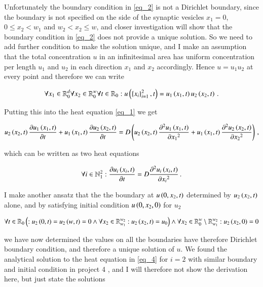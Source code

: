 \documentclass[11pt,english,a4paper]{article}
\begin{document}
\begin{flushleft}
Unfortunately the boundary condition in \eqref{eq_2} is not a Dirichlet boundary, since the boundary is not specified on the side of the synaptic vesicles $x_1=0$, $0\leq x_2 < w_1$ and $w_2 < x_2 \leq w$, and closer investigation will show that the boundary condition in \eqref{eq_2} does not provide a unique solution. So we need to add further condition to make the solution unique, and I make an assumption that the total concentration $u$ in an infinitesimal area has uniform concentration per length $u_1$ and $u_2$ in each direction $x_1$ and $x_2$ accordingly. Hence $u=u_1 u_2$ at every point and therefore we can write

\begin{align}
\forall x_1 \in \mathbb{R}_0^d \forall x_2 \in \mathbb{R}_0^w \forall t \in \mathbb{R}_{0}: u\left({\left\lbrace{x_i}\right\rbrace_{i=1}^2,t}\right) = u_1\left({x_1,t}\right) u_2\left({x_2,t}\right) \,.
\label{eq_3}
\end{align}

Putting this into the heat equation \eqref{eq_1} we get

\begin{align*}
u_2\left({x_2,t}\right)\frac{\partial u_1\left({x_1,t}\right)}{\partial t} + u_1\left({x_1,t}\right)\frac{\partial u_2\left({x_2,t}\right)}{\partial t} = D\left({u_2\left({x_2,t}\right)\frac{\partial^2 u_1\left({x_1,t}\right)}{\partial {x_1}^2} + u_1\left({x_1,t}\right)\frac{\partial^2 u_2\left({x_2,t}\right)}{\partial {x_2}^2}}\right) \,,
\end{align*}

which can be written as two heat equations

\begin{align}
\forall i \in \mathbb{N}_1^2 : \frac{\partial u_i\left({x_i,t}\right)}{\partial t}  = D \frac{\partial^2 u_i\left({x_i,t}\right)}{\partial {x_i}^2} \,.
\label{eq_4}
\end{align}

I make another ansatz that the the boundary at $u\left({0,x_2,t}\right)$ determined by $u_2\left({x_2,t}\right)$ alone, and by satisfying initial condition $u\left({0,x_2,0}\right)$ for $u_2$

\begin{align}
\forall t \in \mathbb{R}_0 \left({: u_2\left({0,t}\right) = u_2\left({w,t}\right) = 0 \wedge \forall x_2\in\mathbb{R}_{w_1}^{w_2}: u_2\left({x_2,t}\right) = u_0}\right) \wedge \forall x_2 \in\mathbb{R}_{0}^{w} \setminus \mathbb{R}_{w_1}^{w_2}: u_2\left({x_2,0}\right) = 0
\label{eq_5}
\end{align}

we have now determined the values on all the boundaries have therefore Dirichlet boundary condition, and therefore a unique solution of $u$. We found the analytical solution to the heat equation in \eqref{eq_4} for $i=2$ with similar boundary and initial condition in project 4 \cite{project4}, and I will therefore not show the derivation here, but just state the solutions


\end{flushleft}
\end{document}

